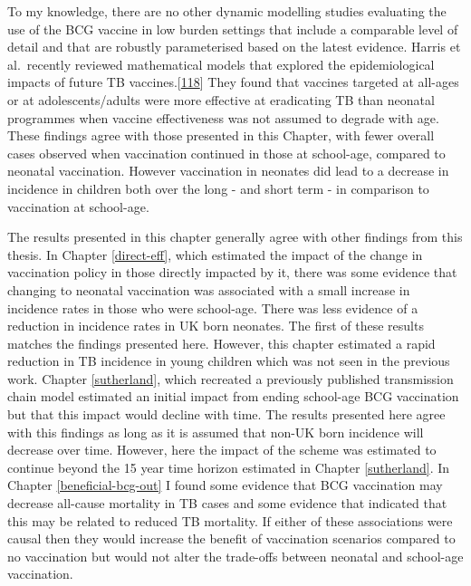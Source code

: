 \documentclass[11pt,twoside]{bristolthesis}
\begin{document}
  To my knowledge, there are no other dynamic modelling studies evaluating the use of the BCG vaccine in low burden settings that include a comparable level of detail and that are robustly parameterised based on the latest evidence. Harris et al.~recently reviewed mathematical models that explored the epidemiological impacts of future TB vaccines.{[}\protect\hyperlink{ref-Harris2016}{118}{]} They found that vaccines targeted at all-ages or at adolescents/adults were more effective at eradicating TB than neonatal programmes when vaccine effectiveness was not assumed to degrade with age. These findings agree with those presented in this Chapter, with fewer overall cases observed when vaccination continued in those at school-age, compared to neonatal vaccination. However vaccination in neonates did lead to a decrease in incidence in children both over the long - and short term - in comparison to vaccination at school-age.
  
  The results presented in this chapter generally agree with other findings from this thesis. In Chapter \ref{direct-eff}, which estimated the impact of the change in vaccination policy in those directly impacted by it, there was some evidence that changing to neonatal vaccination was associated with a small increase in incidence rates in those who were school-age. There was less evidence of a reduction in incidence rates in UK born neonates. The first of these results matches the findings presented here. However, this chapter estimated a rapid reduction in TB incidence in young children which was not seen in the previous work. Chapter \ref{sutherland}, which recreated a previously published transmission chain model estimated an initial impact from ending school-age BCG vaccination but that this impact would decline with time. The results presented here agree with this findings as long as it is assumed that non-UK born incidence will decrease over time. However, here the impact of the scheme was estimated to continue beyond the 15 year time horizon estimated in Chapter \ref{sutherland}. In Chapter \ref{beneficial-bcg-out} I found some evidence that BCG vaccination may decrease all-cause mortality in TB cases and some evidence that indicated that this may be related to reduced TB mortality. If either of these associations were causal then they would increase the benefit of vaccination scenarios compared to no vaccination but would not alter the trade-offs between neonatal and school-age vaccination.
  
\end{document}
